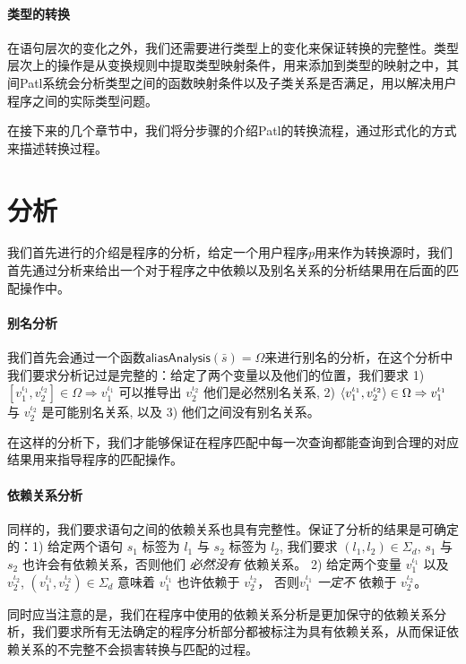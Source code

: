 \paragraph{类型的转换} 在语句层次的变化之外，我们还需要进行类型上的变化来保证转换的完整性。类型层次上的操作是从变换规则中提取类型映射条件，用来添加到类型的映射之中，其间Patl系统会分析类型之间的函数映射条件以及子类关系是否满足，用以解决用户程序之间的实际类型问题。

在接下来的几个章节中，我们将分步骤的介绍Patl的转换流程，通过形式化的方式来描述转换过程。

\section{分析}
我们首先进行的介绍是程序的分析，给定一个用户程序$p$用来作为转换源时，我们首先通过分析来给出一个对于程序之中依赖以及别名关系的分析结果用在后面的匹配操作中。

\paragraph{别名分析} 我们首先会通过一个函数$\mathsf{aliasAnalysis}(\bar{s})=\Omega$来进行别名的分析，在这个分析中我们要求分析记过是完整的：给定了两个变量以及他们的位置，我们要求 1)
$[v_1^{\iota_1},v_2^{\iota_2}]\in\Omega\Rightarrow v_1^{\iota_1}$ 可以推导出
$v_2^{\iota_2}$ 他们是必然别名关系, 2)
$\langle{v_1^{\iota_1},v_2^{\iota_2}}\rangle\in\Omega\Rightarrow v_1^{\iota_1}$
与 $v_2^{\iota_2}$ 是可能别名关系, 以及 3) 他们之间没有别名关系。

在这样的分析下，我们才能够保证在程序匹配中每一次查询都能查询到合理的对应结果用来指导程序的匹配操作。

\paragraph{依赖关系分析}
同样的，我们要求语句之间的依赖关系也具有完整性。保证了分析的结果是可确定的：1) 给定两个语句 $s_1$ 标签为 $l_1$ 与 $s_2$ 标签为 $l_2$, 我们要求 $(l_1, l_2)\in\Sigma_d$, $s_1$ 与 $s_2$ 也许会有依赖关系，否则他们 \emph{必然没有} 依赖关系。 2) 给定两个变量 $v_1^{\iota_1}$ 以及 $v_2^{\iota_2}$, $(v_1^{\iota_1},v_2^{\iota_2})\in\Sigma_d$ 意味着 $v_1^{\iota_1}$ 也许依赖于 $v_2^{\iota_2}$， 否则$v_1^{\iota_1}$ \emph{一定不} 依赖于 $v_2^{\iota_2}$。

同时应当注意的是，我们在程序中使用的依赖关系分析是更加保守的依赖关系分析，我们要求所有无法确定的程序分析部分都被标注为具有依赖关系，从而保证依赖关系的不完整不会损害转换与匹配的过程。

